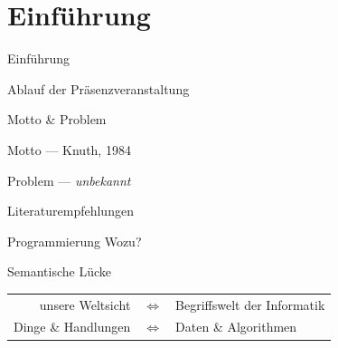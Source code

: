 \section{Einführung}\label{sec:0-einfuehrung}
\begin{frame}{}
\begin{center}
\Huge Einführung
\end{center}
\end{frame}

\begin{frame}{Ablauf der Präsenzveranstaltung}
\end{frame}

\begin{frame}{Motto \& Problem}
    \begin{block}{Motto}
         --- Knuth, 1984
    \end{block}
    \begin{block}{Problem}
         --- \emph{unbekannt}
    \end{block}
\end{frame}

\begin{frame}{Literaturempfehlungen}
    \nocite{*}
    \printbibliography
\end{frame}

\begin{frame}{Programmierung Wozu?}
    \begin{block}{Semantische Lücke}
        \begin{tabular}{rcl}
            unsere Weltsicht&$\Leftrightarrow$&Begriffswelt der Informatik\\
            Dinge \& Handlungen&$\Leftrightarrow$&Daten \& Algorithmen
        \end{tabular}
    \end{block}
\end{frame}

